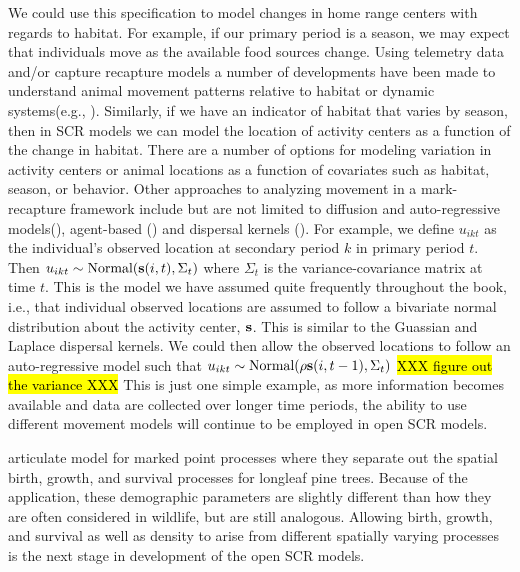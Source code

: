 We could use this specification to model changes in  home range
centers with regards to habitat.  For example, if our primary period
is a season, we may expect that individuals move as
the available food sources change. Using telemetry data and/or capture recapture models
a number of developments have been made to understand animal movement patterns relative
to habitat or dynamic systems(e.g., \cite{jonsen_etal:2005, hooten_wikle:2010}).
Similarly, if we have an indicator of habitat that varies by season, then in SCR models
we can model the location of activity centers as a function of the change in habitat.
There are a number of options for modeling variation in activity centers or animal locations as
a function of covariates such as habitat, season, or behavior.
Other approaches to analyzing movement in a mark-recapture framework include but are not limited to
diffusion and auto-regressive models(\cite{ovaskainen:2004,
ovaskainen_etal:2008}), agent-based (\cite{grimm_etal:2005, hooten_etal:2010})
and dispersal kernels (\cite{fujiwara_etal:2006}).  For example, we define $u_{ikt}$ as the individual's
observed location
at secondary period $k$ in primary period $t$.
Then
$u_{ikt} \sim  \mbox{Normal}({\bf s}(i,t), \Sigma_t)$ where $\Sigma_t$
is the variance-covariance matrix at time $t$.  This is the model
we have assumed quite frequently throughout the book, i.e., that individual observed locations are
assumed to follow a bivariate normal distribution about the activity center, ${\bf s}$. This
is similar to the Guassian and Laplace dispersal kernels.  We could then allow the observed locations
to follow an auto-regressive model such that $u_{ikt} \sim  \mbox{Normal}(\rho {\bf s}(i,t-1), \Sigma_t)$
\hl{XXX figure out the variance XXX}  This is just one simple example, as more information becomes available
and data are collected
over longer time periods, the ability to use different movement models will continue to be employed
in open SCR models.



\citet{rathbun_cressie:1994} articulate model for
marked point processes where they separate out the spatial birth, growth, and survival processes for longleaf
pine trees.  Because of the application, these demographic parameters are slightly different than how they are
often considered in wildlife, but are still analogous.  Allowing birth, growth, and survival as well as density
to arise from different spatially varying processes is the next stage in development of the open SCR models.

